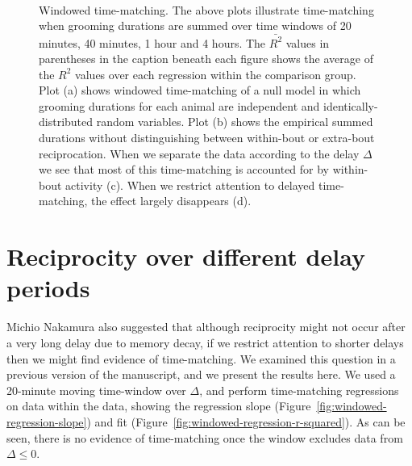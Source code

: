 \documentclass[12pt]{article}
\begin{document}
\begin{figure*}
  \begin{center}
     \\
  \end{center}
  \caption{Windowed time-matching.  The above plots illustrate 
time-matching when grooming durations are summed over time windows of 20 
minutes, 40 minutes, 1 hour and 4 hours.  The $\bar{R^2}$ values in parentheses in the caption beneath each figure shows the average of the $R^2$ values over each regression within the comparison group. Plot (a) shows windowed time-matching
of a null model in which grooming durations for each animal are independent and 
identically-distributed random variables.  Plot (b) shows
the empirical summed durations without distinguishing between within-bout or extra-bout
reciprocation.  When we separate the data according to the delay $\Delta$ we 
see that most of this time-matching is accounted for by within-bout activity (c).
When we restrict attention to delayed time-matching, the effect
largely disappears (d).\label{fig:windowed}}
\end{figure*}

\section{Reciprocity over different delay periods}

Michio Nakamura also suggested that although reciprocity might not occur after a 
very long delay due to memory decay, if we restrict attention to shorter delays 
then we might find evidence of time-matching.  We examined this question in a 
previous version of the manuscript, and we present the results here.  We used a 
20-minute moving time-window over $\Delta$, and perform time-matching regressions on data within the data, showing the regression slope (Figure~\ref{fig:windowed-regression-slope}) and fit (Figure~\ref{fig:windowed-regression-r-squared}). 
As can be seen, there is no evidence of time-matching once the window excludes
data from $\Delta \leq 0$.
\end{document}
